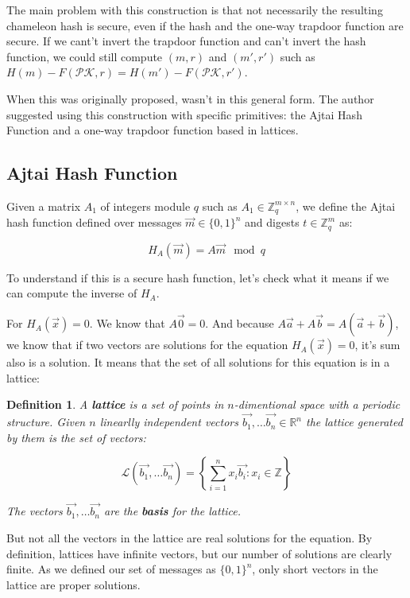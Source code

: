 \documentclass[a4paper]{article}
\newtheorem{definicao}{Definition}
\begin{document}
The main problem with this construction is that not necessarily the resulting chameleon hash is secure, even if the hash and the one-way trapdoor function are secure. If we cant't invert the trapdoor function and can't invert the hash function, we could still compute $(m, r)$ and $(m', r')$ such as $H(m) - F(\mathcal{PK}, r)=H(m') - F(\mathcal{PK}, r')$.

When this was originally proposed, wasn't in this general form. The author suggested using this construction with specific primitives: the Ajtai Hash Function and a one-way trapdoor function based in lattices.

\subsection{Ajtai Hash Function}

Given a  matrix $A_1$ of integers module $q$ such as $A_1 \in \mathbb{Z}_q^{m\times n}$, we define the Ajtai hash function defined over messages $\overrightarrow{m} \in \{0,1\}^{n}$ and digests $t \in \mathbb{Z}_q^m$ as:

$$
H_A(\overrightarrow{m}) = A\overrightarrow{m} \mod q
$$
 
To understand if this is a secure hash function, let's check what it means if we can compute the inverse of $H_A$.

For $H_A(\overrightarrow{x})=0$. We know that $A\overrightarrow{0}=0$. And because $A\overrightarrow{a} + A \overrightarrow{b} = A(\overrightarrow{a}+\overrightarrow{b})$, we know that if two vectors are solutions for the equation  $H_A(\overrightarrow{x})=0$, it's sum also is a solution. It means that the set of all solutions for this equation is in a lattice:

\begin{definicao}
 A \textbf{lattice} is a set of points in $n$-dimentional space with a periodic structure. Given $n$ linearlly independent vectors $\overrightarrow{b_1},\ldots\overrightarrow{b_n} \in \mathbb{R}^n$ the lattice generated by them is the set of vectors:
 
 $$
 \mathcal{L}(\overrightarrow{b_1},\ldots\overrightarrow{b_n})=\left\{\sum_{i=1}^nx_i\overrightarrow{b_i} : x_i \in \mathbb{Z}\right\}
 $$
 
 The vectors $\overrightarrow{b_1},\ldots\overrightarrow{b_n}$ are the \textbf{basis} for the lattice.
\end{definicao}
 
But not all the vectors in the lattice are real solutions for the equation. By definition, lattices have infinite vectors, but our number of solutions are clearly finite. As we defined our set of messages as $\{0, 1\}^n$, only short vectors in the lattice are proper solutions.
\end{document}
